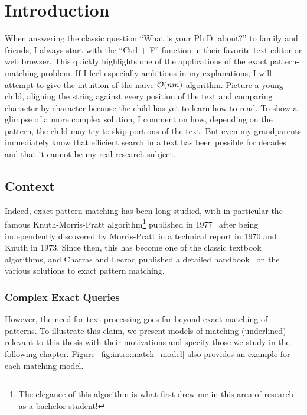 \chapter*{Introduction}\label{chap:intro}\setcounter{page}{1}\frontmatter
{}

When answering the classic question ``What is your Ph.D. about?'' to family and friends, I always start with the ``Ctrl + F'' function in their favorite text editor or web browser. This quickly highlights one of the applications of the exact pattern-matching problem. If I feel especially ambitious in my explanations, I will attempt to give the intuition of the naive $\mathcal{O}(nm)$ algorithm. Picture a young child, aligning the string against every position of the text and comparing character by character because the child has yet to learn how to read. To show a glimpse of a more complex solution, I comment on how, depending on the pattern, the child may try to skip portions of the text. But even my grandparents immediately know that efficient search in a text has been possible for decades and that it cannot be my real research subject.

\section{Context}

Indeed, exact pattern matching has been long studied, with in particular the famous Knuth-Morris-Pratt algorithm\footnote{The elegance of this algorithm is what first drew me in this area of research as a bachelor student!} published in 1977~\cite{KMP} after being independently discovered by Morris-Pratt in a technical report in 1970 and Knuth in 1973. Since then, this has become one of the classic textbook algorithms, and Charras and Lecroq published a detailed handbook~\cite{charras2004handbook} on the various solutions to exact pattern matching.

\subsection{Complex Exact Queries}\label{sec:intro:complex}



However, the need for text processing goes far beyond exact matching of patterns. To illustrate this claim, we present models of matching (underlined) relevant to this thesis with their motivations and specify those we study in the following chapter. Figure~\ref{fig:intro:match_model} also provides an example for each matching model.

